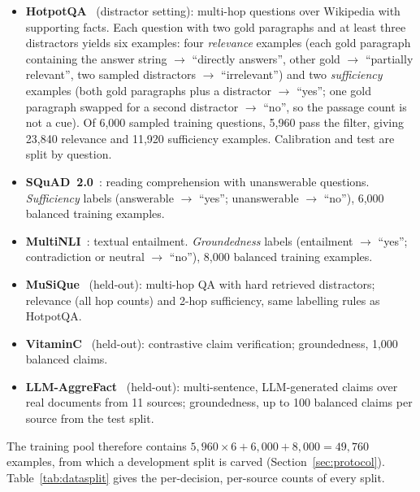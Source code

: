 \documentclass[twocolumn]{ICCKjournal}
\begin{document}
\begin{itemize}[leftmargin=*]
    \item \textbf{HotpotQA}~\cite{yang2018hotpotqa} (distractor setting): multi-hop questions over Wikipedia with supporting facts. Each question with two gold paragraphs and at least three distractors yields six examples: four \emph{relevance} examples (each gold paragraph containing the answer string $\to$ ``directly answers'', other gold $\to$ ``partially relevant'', two sampled distractors $\to$ ``irrelevant'') and two \emph{sufficiency} examples (both gold paragraphs plus a distractor $\to$ ``yes''; one gold paragraph swapped for a second distractor $\to$ ``no'', so the passage count is not a cue). Of 6,000 sampled training questions, 5,960 pass the filter, giving 23,840 relevance and 11,920 sufficiency examples. Calibration and test are split by question.
    \item \textbf{SQuAD~2.0}~\cite{rajpurkar2018squad2}: reading comprehension with unanswerable questions. \emph{Sufficiency} labels (answerable $\to$ ``yes''; unanswerable $\to$ ``no''), 6,000 balanced training examples.
    \item \textbf{MultiNLI}~\cite{williams2018multinli}: textual entailment. \emph{Groundedness} labels (entailment $\to$ ``yes''; contradiction or neutral $\to$ ``no''), 8,000 balanced training examples.
    \item \textbf{MuSiQue}~\cite{trivedi2022musique} (held-out): multi-hop QA with hard retrieved distractors; relevance (all hop counts) and 2-hop sufficiency, same labelling rules as HotpotQA.
    \item \textbf{VitaminC}~\cite{schuster2021vitaminc} (held-out): contrastive claim verification; groundedness, 1,000 balanced claims.
    \item \textbf{LLM-AggreFact}~\cite{tang2024minicheck} (held-out): multi-sentence, LLM-generated claims over real documents from 11 sources; groundedness, up to 100 balanced claims per source from the test split.
\end{itemize}

The training pool therefore contains $5{,}960 \times 6 + 6{,}000 + 8{,}000 = 49{,}760$ examples, from which a development split is carved (Section~\ref{sec:protocol}). Table~\ref{tab:datasplit} gives the per-decision, per-source counts of every split.

\begin{table}[H]
\caption{Examples per decision, source and split. Dev is carved from the training pool (5\%, grouped by question) and used only for checkpoint selection; Calib only for temperatures, cascade thresholds and baseline mappings; Test only for reporting. Held-out sets are never used for training or calibration.}
\label{tab:datasplit}
\centering
\small
\begin{adjustbox}{max width=\linewidth}

\end{adjustbox}
\end{table}
\end{document}
